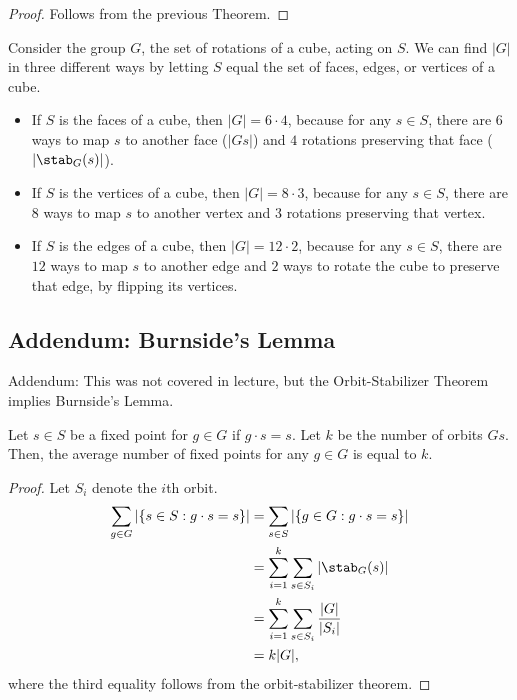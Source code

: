 \begin{proof}
Follows from the previous Theorem.
\end{proof}

\begin{example}
\exlabel

Consider the group $G$, the set of rotations of a cube, acting on $S$. We can find $\vert G\vert$ in three different ways by letting $S$ equal the set of faces, edges, or vertices of a cube.

\begin{itemize}
    \item If $S$ is the faces of a cube, then $\vert G\vert = 6\cdot 4$, because for any $s\in S$, there are $6$ ways to map $s$ to another face ($\vert Gs\vert$) and $4$ rotations preserving that face ($\vert \stab_G(s)\vert$).
    \item If $S$ is the vertices of a cube, then $\vert G\vert = 8\cdot 3$, because for any $s\in S$, there are $8$ ways to map $s$ to another vertex and $3$ rotations preserving that vertex.
    \item If $S$ is the edges of a cube, then $\vert G\vert = 12\cdot 2$, because for any $s\in S$, there are $12$ ways to map $s$ to another edge and $2$ ways to rotate the cube to preserve that edge, by flipping its vertices.
\end{itemize}
\end{example}

\subsection{Addendum: Burnside's Lemma}

Addendum: This was not covered in lecture, but the Orbit-Stabilizer Theorem implies Burnside's Lemma. 

\begin{theorem}

Let $s\in S$ be a fixed point for $g\in G$ if $g\cdot s = s$. Let $k$ be the number of orbits $Gs$. Then, the average number of fixed points for any $g\in G$ is equal to $k$.
\end{theorem}


\begin{proof}
Let $S_i$ denote the $i$th orbit.
\begin{align*}
    \sum_{g\in G}\vert \{s\in S : g\cdot s = s\}\vert &= \sum_{s\in S}\vert \{g\in G: g\cdot s = s\}\vert\\
    &= \sum_{i=1}^k \sum_{s\in S_i}\vert\stab_G(s)\vert \\
    &= \sum_{i=1}^k \sum_{s\in S_i}\frac{\vert G\vert}{\vert S_i\vert} \\
    &= k\vert G\vert,
\end{align*}
where the third equality follows from the orbit-stabilizer theorem.
\end{proof}

